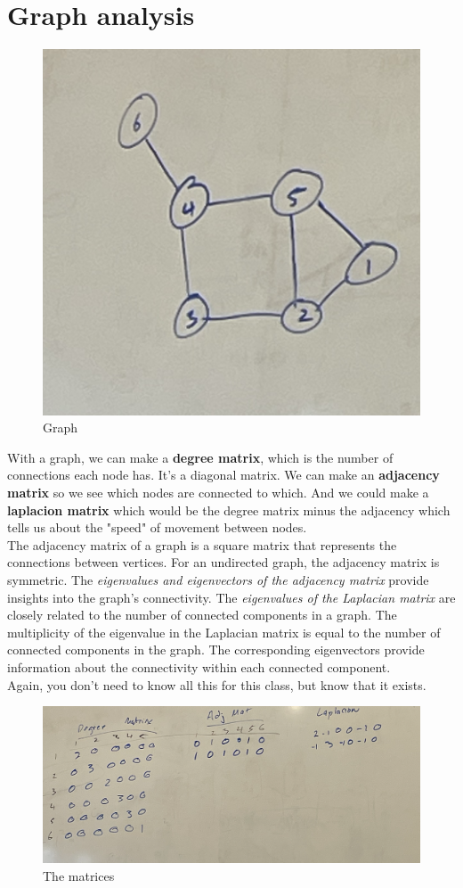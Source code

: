 \documentclass{article}
\begin{document}
\section{Graph analysis}

\begin{figure}[htp]
    \centering
    \includegraphics[width=0.5\linewidth]{Screen Shot 2023-11-29 at 11.37.38 AM.png}
    \caption{Graph}
    \label{fig:enter-label}
\end{figure}

With a graph, we can make a \textbf{degree matrix}, which is the number of connections each node has. It's a diagonal matrix. We can make an \textbf{adjacency matrix} so we see which nodes are connected to which. And we could make a \textbf{laplacion matrix} which would be the degree matrix minus the adjacency which tells us about the "speed" of movement between nodes. \\

The adjacency matrix of a graph is a square matrix that represents the connections between vertices. For an undirected graph, the adjacency matrix is symmetric. The \textit{eigenvalues and eigenvectors of the adjacency matrix} provide insights into the graph's connectivity. The \textit{eigenvalues of the Laplacian matrix} are closely related to the number of connected components in a graph. The multiplicity of the eigenvalue in the Laplacian matrix is equal to the number of connected components in the graph. The corresponding eigenvectors provide information about the connectivity within each connected component.\\

Again, you don't need to know all this for this class, but know that it exists. 

\begin{figure}[htp]
    \centering
    \includegraphics[width=0.75\linewidth]{Screen Shot 2023-11-29 at 11.45.06 AM.png}
    \caption{The matrices}
    \label{fig:enter-label}
\end{figure}
\end{document}
